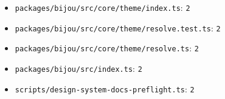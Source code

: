 \begin{itemize}
\item
  \texttt{p\allowbreak{}a\allowbreak{}c\allowbreak{}k\allowbreak{}a\allowbreak{}g\allowbreak{}e\allowbreak{}s\allowbreak{}/\allowbreak{}b\allowbreak{}i\allowbreak{}j\allowbreak{}o\allowbreak{}u\allowbreak{}/\allowbreak{}s\allowbreak{}r\allowbreak{}c\allowbreak{}/\allowbreak{}c\allowbreak{}o\allowbreak{}r\allowbreak{}e\allowbreak{}/\allowbreak{}t\allowbreak{}h\allowbreak{}e\allowbreak{}m\allowbreak{}e\allowbreak{}/\allowbreak{}i\allowbreak{}n\allowbreak{}d\allowbreak{}e\allowbreak{}x\allowbreak{}.\allowbreak{}t\allowbreak{}s}: \texttt{2}
\item
  \texttt{p\allowbreak{}a\allowbreak{}c\allowbreak{}k\allowbreak{}a\allowbreak{}g\allowbreak{}e\allowbreak{}s\allowbreak{}/\allowbreak{}b\allowbreak{}i\allowbreak{}j\allowbreak{}o\allowbreak{}u\allowbreak{}/\allowbreak{}s\allowbreak{}r\allowbreak{}c\allowbreak{}/\allowbreak{}c\allowbreak{}o\allowbreak{}r\allowbreak{}e\allowbreak{}/\allowbreak{}t\allowbreak{}h\allowbreak{}e\allowbreak{}m\allowbreak{}e\allowbreak{}/\allowbreak{}r\allowbreak{}e\allowbreak{}s\allowbreak{}o\allowbreak{}l\allowbreak{}v\allowbreak{}e\allowbreak{}.\allowbreak{}t\allowbreak{}e\allowbreak{}s\allowbreak{}t\allowbreak{}.\allowbreak{}t\allowbreak{}s}: \texttt{2}
\item
  \texttt{p\allowbreak{}a\allowbreak{}c\allowbreak{}k\allowbreak{}a\allowbreak{}g\allowbreak{}e\allowbreak{}s\allowbreak{}/\allowbreak{}b\allowbreak{}i\allowbreak{}j\allowbreak{}o\allowbreak{}u\allowbreak{}/\allowbreak{}s\allowbreak{}r\allowbreak{}c\allowbreak{}/\allowbreak{}c\allowbreak{}o\allowbreak{}r\allowbreak{}e\allowbreak{}/\allowbreak{}t\allowbreak{}h\allowbreak{}e\allowbreak{}m\allowbreak{}e\allowbreak{}/\allowbreak{}r\allowbreak{}e\allowbreak{}s\allowbreak{}o\allowbreak{}l\allowbreak{}v\allowbreak{}e\allowbreak{}.\allowbreak{}t\allowbreak{}s}: \texttt{2}
\item
  \texttt{p\allowbreak{}a\allowbreak{}c\allowbreak{}k\allowbreak{}a\allowbreak{}g\allowbreak{}e\allowbreak{}s\allowbreak{}/\allowbreak{}b\allowbreak{}i\allowbreak{}j\allowbreak{}o\allowbreak{}u\allowbreak{}/\allowbreak{}s\allowbreak{}r\allowbreak{}c\allowbreak{}/\allowbreak{}i\allowbreak{}n\allowbreak{}d\allowbreak{}e\allowbreak{}x\allowbreak{}.\allowbreak{}t\allowbreak{}s}: \texttt{2}
\item
  \texttt{s\allowbreak{}c\allowbreak{}r\allowbreak{}i\allowbreak{}p\allowbreak{}t\allowbreak{}s\allowbreak{}/\allowbreak{}d\allowbreak{}e\allowbreak{}s\allowbreak{}i\allowbreak{}g\allowbreak{}n\allowbreak{}-\allowbreak{}s\allowbreak{}y\allowbreak{}s\allowbreak{}t\allowbreak{}e\allowbreak{}m\allowbreak{}-\allowbreak{}d\allowbreak{}o\allowbreak{}c\allowbreak{}s\allowbreak{}-\allowbreak{}p\allowbreak{}r\allowbreak{}e\allowbreak{}f\allowbreak{}l\allowbreak{}i\allowbreak{}g\allowbreak{}h\allowbreak{}t\allowbreak{}.\allowbreak{}t\allowbreak{}s}: \texttt{2}

\end{itemize}

